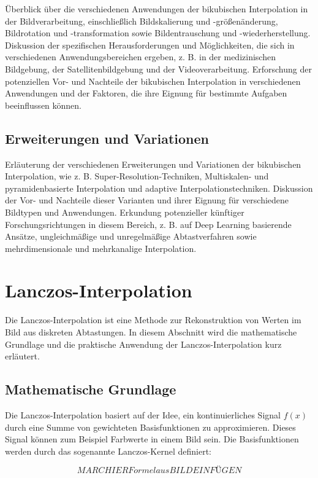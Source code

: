     Überblick über die verschiedenen Anwendungen der bikubischen Interpolation in der Bildverarbeitung, einschließlich Bildskalierung und -größenänderung, Bildrotation und -transformation sowie Bildentrauschung und -wiederherstellung.
    Diskussion der spezifischen Herausforderungen und Möglichkeiten, die sich in verschiedenen Anwendungsbereichen ergeben, z. B. in der medizinischen Bildgebung, der Satellitenbildgebung und der Videoverarbeitung.
    Erforschung der potenziellen Vor- und Nachteile der bikubischen Interpolation in verschiedenen Anwendungen und der Faktoren, die ihre Eignung für bestimmte Aufgaben beeinflussen können.

    \subsection{Erweiterungen und Variationen}

    Erläuterung der verschiedenen Erweiterungen und Variationen der bikubischen Interpolation, wie z. B. Super-Resolution-Techniken, Multiskalen- und pyramidenbasierte Interpolation und adaptive Interpolationstechniken.
    Diskussion der Vor- und Nachteile dieser Varianten und ihrer Eignung für verschiedene Bildtypen und Anwendungen.
    Erkundung potenzieller künftiger Forschungsrichtungen in diesem Bereich, z. B. auf Deep Learning basierende Ansätze, ungleichmäßige und unregelmäßige Abtastverfahren sowie mehrdimensionale und mehrkanalige Interpolation.


\section{Lanczos-Interpolation}
Die Lanczos-Interpolation ist eine Methode zur Rekonstruktion von Werten im Bild aus diskreten Abtastungen. 
In diesem Abschnitt wird die mathematische Grundlage und die praktische Anwendung der Lanczos-Interpolation kurz erläutert.

\subsection{Mathematische Grundlage}

Die Lanczos-Interpolation basiert auf der Idee, ein kontinuierliches Signal $f(x)$ durch eine Summe von gewichteten Basisfunktionen zu approximieren. 
Dieses Signal können zum Beispiel Farbwerte in einem Bild sein.
Die Basisfunktionen werden durch das sogenannte Lanczos-Kernel definiert:

\begin{equation}
MARC HIER Formel aus BILD EINFÜGEN
\end{equation}

